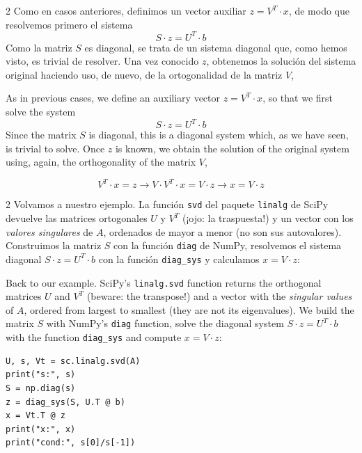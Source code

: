 \begin{paracol}{2}
Como en casos anteriores, definimos un vector auxiliar $z=V^T\cdot x$, de modo que resolvemos primero el sistema
\begin{equation*}
S\cdot z= U^T\cdot b
\end{equation*}
Como la matriz $S$ es diagonal, se trata de un sistema diagonal que, como hemos visto, es trivial de resolver. Una vez conocido $z$, obtenemos la solución del sistema original haciendo uso, de nuevo, de la ortogonalidad de la matriz $V$,

\switchcolumn

As in previous cases, we define an auxiliary vector $z=V^T\cdot x$, so that we first solve the system
\begin{equation*}
S\cdot z= U^T\cdot b
\end{equation*}
Since the matrix $S$ is diagonal, this is a diagonal system which, as we have seen, is trivial to solve. Once $z$ is known, we obtain the solution of the original system using, again, the orthogonality of the matrix $V$,
\end{paracol}

\begin{equation*}
V^T\cdot x=z \rightarrow V\cdot V^T\cdot x=V\cdot z \rightarrow x=V\cdot z
\end{equation*}

\begin{paracol}{2}
Volvamos a nuestro ejemplo. La función \texttt{svd} del paquete \texttt{linalg} de SciPy devuelve las matrices ortogonales $U$ y $V^T$ (¡ojo: la traspuesta!) y un vector con los \emph{valores singulares} de $A$, ordenados de mayor a menor (no son sus autovalores). Construimos la matriz $S$ con la función \texttt{diag} de NumPy, resolvemos el sistema diagonal $S\cdot z = U^T \cdot b$ con la función \texttt{diag\_sys} y calculamos $x=V \cdot z$:

\switchcolumn
Back to our example. SciPy's \texttt{linalg.svd} function returns the orthogonal matrices $U$ and $V^T$ (beware: the transpose!) and a vector with the \emph{singular values} of $A$, ordered from largest to smallest (they are not its eigenvalues). We build the matrix $S$ with NumPy's \texttt{diag} function, solve the diagonal system $S \cdot z = U^T \cdot b$ with the function \texttt{diag\_sys} and compute $x=V \cdot z$:
\end{paracol}
\begin{verbatim}
U, s, Vt = sc.linalg.svd(A)
print("s:", s)
S = np.diag(s)
z = diag_sys(S, U.T @ b)
x = Vt.T @ z
print("x:", x)
print("cond:", s[0]/s[-1])
\end{verbatim}

